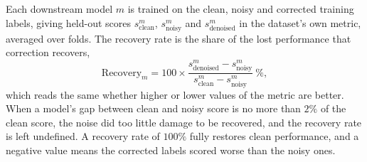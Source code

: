 Each downstream model $m$ is trained on the clean, noisy and corrected training labels, giving held-out scores $s^{m}_{\text{clean}}$, $s^{m}_{\text{noisy}}$ and $s^{m}_{\text{denoised}}$ in the dataset's own metric, averaged over folds. The recovery rate is the share of the lost performance that correction recovers,
\begin{equation}
\mathrm{Recovery}_m = 100 \times \frac{s^{m}_{\text{denoised}} - s^{m}_{\text{noisy}}}{s^{m}_{\text{clean}} - s^{m}_{\text{noisy}}}\ \%,
\label{eq:recovery}
\end{equation}
which reads the same whether higher or lower values of the metric are better. When a model's gap between clean and noisy score is no more than $2\%$ of the clean score, the noise did too little damage to be recovered, and the recovery rate is left undefined. A recovery rate of $100\%$ fully restores clean performance, and a negative value means the corrected labels scored worse than the noisy ones.
% 
% 



